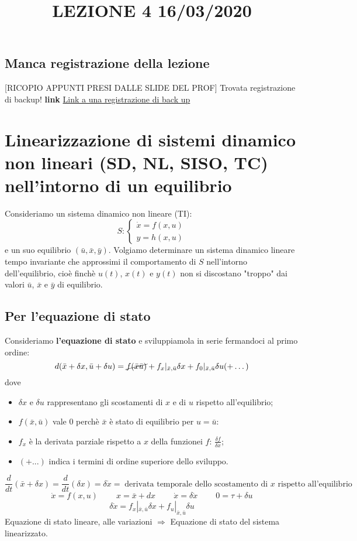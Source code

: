 \title{LEZIONE 4 16/03/2020}\newline
\subsection*{Manca registrazione della lezione}
[RICOPIO APPUNTI PRESI DALLE SLIDE DEL PROF] \newline
Trovata registrazione di backup! \newline
\textbf{link} \href{https://onedrive.live.com/?authkey=%21AATVJK3srNwxGzs&id=EE092FF4FF7B5B0E%212158&cid=EE092FF4FF7B5B0E}{Link a una registrazione di back up}
\section{Linearizzazione di sistemi dinamico non lineari (SD, NL, SISO, TC) nell'intorno di un equilibrio}
Consideriamo un sistema dinamico non lineare (TI):
\[
    S: \begin{cases}
        \dot{x} = f(x,u)\\
        y = h(x,u)
    \end{cases}
\]
e un suo equilibrio $(\bar{u}, \bar{x}, \bar{y})$.\newline
\newline
Volgiamo determinare un sistema dinamico lineare tempo invariante che approssimi il comportamento di $S$ nell'intorno dell'equilibrio, cioè finchè $u(t)$, $x(t)$ e $y(t)$ non si discostano "troppo" dai valori $\bar{u}$, $\bar{x}$ e $\bar{y}$ di equilibrio.
\subsection{Per l'equazione di stato}
Consideriamo \textbf{l'equazione di stato} e sviluppiamola in serie fermandoci al primo ordine:
\[
    d(\bar{x} + \delta x, \bar{u} + \delta u) = \cancel{ f(\bar{x} \bar{u})} + f_x|_{\bar{x}, \bar{u}}\delta x + f_0|_{\bar{x}, \bar{u}} \delta u (+ \dots)
\]
dove
\begin{itemize}
    \item $\delta x$ e $\delta u$ rappresentano gli scostamenti di $x$ e di $u$ rispetto all'equilibrio;
    \item $f(\bar{x}, \bar{u})$ vale $0$ perchè $\bar{x}$ è stato di equilibrio per $u = \bar{u}$:
    \item $f_x$ è la derivata parziale rispetto a $x$ della funzionei $f$: $\frac{\delta f}{\delta x}$;
    \item $(+ ...)$ indica i termini di ordine superiore dello sviluppo.
\end{itemize}
\[
    \frac{d}{dt} (\bar{x} + \delta x) = \frac{d}{dt} (\delta x) = \delta \dot{x} = \; \text{derivata temporale dello scostamento di $x$ rispetto all'equilibrio}\;
\]
\[
    \dot{x} = f(x,u) \;\;\;\;\;\;\;\; x = \bar{x} + dx \;\;\;\;\;\;\;\; \dot{x} = \delta \dot{x} \;\;\;\;\;\;\;\; 0 = \tau + \delta u
\]
\[
    \delta \dot{x} = f_x|_{\bar{x}, \bar{u}} \delta x + f_u |_{\bar{x}, \bar{u}} \delta u
\]
Equazione di stato lineare, alle variazioni $\Longrightarrow$ Equazione di stato del sistema linearizzato.
